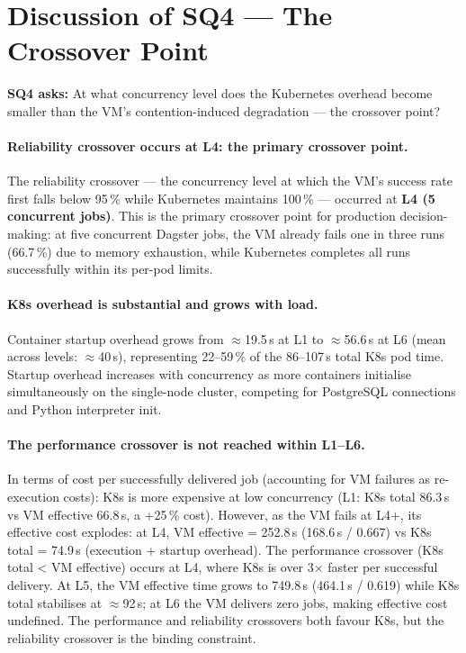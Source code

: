 
\section{Discussion of SQ4 --- The Crossover Point}
\label{sec:discuss-sq4}

\textbf{SQ4 asks:} At what concurrency level does the Kubernetes overhead become smaller than the VM's contention-induced degradation --- the crossover point?

\paragraph{Reliability crossover occurs at L4: the primary crossover point.}
The reliability crossover --- the concurrency level at which the VM's success rate first falls below 95\,\% while Kubernetes maintains 100\,\% --- occurred at \textbf{L4 (5 concurrent jobs)}.
This is the primary crossover point for production decision-making: at five concurrent Dagster jobs, the VM already fails one in three runs (66.7\,\%) due to memory exhaustion, while Kubernetes completes all runs successfully within its per-pod limits.

\paragraph{K8s overhead is substantial and grows with load.}
Container startup overhead grows from $\approx$19.5\,s at L1 to $\approx$56.6\,s at L6 (mean across levels: $\approx$40\,s), representing 22--59\,\% of the 86--107\,s total K8s pod time.
Startup overhead increases with concurrency as more containers initialise simultaneously on the single-node cluster, competing for PostgreSQL connections and Python interpreter init.

\paragraph{The performance crossover is not reached within L1--L6.}
In terms of cost per successfully delivered job (accounting for VM failures as re-execution costs):
K8s is more expensive at low concurrency (L1: K8s total 86.3\,s vs VM effective 66.8\,s, a +25\,\% cost).
However, as the VM fails at L4+, its effective cost explodes: at L4, VM effective = 252.8\,s (168.6\,s / 0.667) vs K8s total = 74.9\,s (execution + startup overhead).
The performance crossover (K8s total < VM effective) occurs at L4, where K8s is over 3$\times$ faster per successful delivery.
At L5, the VM effective time grows to 749.8\,s (464.1\,s / 0.619) while K8s total stabilises at $\approx$92\,s; at L6 the VM delivers zero jobs, making effective cost undefined.
The performance and reliability crossovers both favour K8s, but the reliability crossover is the binding constraint.

